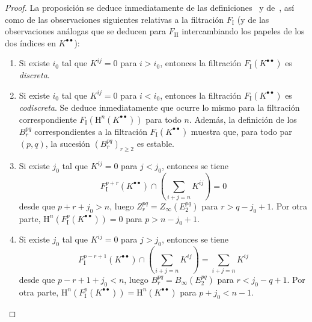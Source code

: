 \begin{proof}
La proposición se deduce inmediatamente de las definiciones~ y de~, así como de las observaciones siguientes relativas a la filtración $F_{\mathrm I}$ (y de las observaciones análogas que se deducen para $F_{\mathrm{II}}$ intercambiando los papeles de los dos índices en $K^{\bullet\bullet}$):
\begin{enumerate}
  \item[{$1^\circ$}] Si existe $i_0$ tal que $K^{ij}=0$ para $i>i_0$, entonces la filtración $F_{\mathrm I}(K^{\bullet\bullet})$ es \emph{discreta}.
  \item[{$2^\circ$}] Si existe $i_0$ tal que $K^{ij}=0$ para $i<i_0$, entonces la filtración $F_{\mathrm I}(K^{\bullet\bullet})$ es \emph{codiscreta}.
    Se deduce inmediatamente que ocurre lo mismo para la filtración correspondiente $F_{\mathrm I}(\mathrm H^n(K^{\bullet\bullet}))$ para todo $n$.
    Además, la definición de los $B_r^{pq}$ correspondientes a la filtración $F_{\mathrm I}(K^{\bullet\bullet})$  muestra que, para todo par $(p,q)$, la sucesión $(B_r^{pq})_{r\geq2}$ es estable.
  \item[{$3^\circ$}] Si existe $j_0$ tal que $K^{ij}=0$ para $j<j_0$, entonces se tiene
    \[
      F_{\mathrm I}^{p+r}(K^{\bullet\bullet})
      \cap\left(\sum_{i+j=n}K^{ij}\right)=0
    \]
    desde que $p+r+j_0>n$, luego $Z_r^{pq}=Z_\infty(E_2^{pq})$ para $r>q-j_0+1$.
    Por otra parte, $\mathrm H^n(F_{\mathrm I}^p(K^{\bullet\bullet}))=0$ para $p>n-j_0+1$.
  \item[{$4^\circ$}] Si existe $j_0$ tal que $K^{ij}=0$ para $j>j_0$, entonces se tiene
    \[
      F_{\mathrm I}^{p-r+1}(K^{\bullet\bullet})
      \cap\left(\sum_{i+j=n}K^{ij}\right)=\sum_{i+j=n}K^{ij}
    \]
    desde que $p-r+1+j_0<n$, luego $B_r^{pq}=B_\infty(E_2^{pq})$ para $r<j_0-q+1$.
    Por otra parte, $\mathrm H^n(F_{\mathrm I}^p(K^{\bullet\bullet}))
    =\mathrm H^n(K^{\bullet\bullet})$ para $p+j_0<n-1$.
\end{enumerate}
\end{proof}

